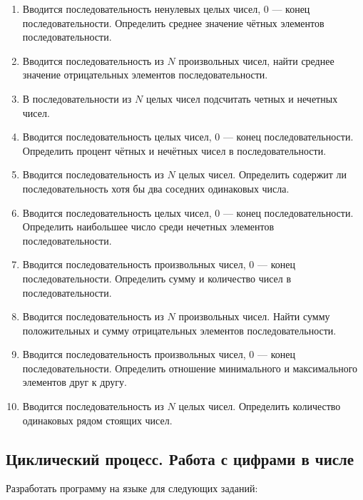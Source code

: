 \begin{enumerate}
\item Вводится последовательность ненулевых целых чисел, 0 --- конец последовательности. Определить среднее значение
чётных элементов последовательности.
\item Вводится последовательность из $N$ произвольных чисел, найти среднее значение отрицательных
элементов последовательности.
\item В последовательности из $N$ целых чисел подсчитать четных и нечетных чисел.
\item Вводится последовательность целых чисел, 0 --- конец последовательности. Определить процент чётных и нечётных чисел
в последовательности.
\item Вводится последовательность из $N$ целых чисел. Определить содержит ли последовательность хотя
бы два соседних одинаковых числа.
\item Вводится последовательность целых чисел, 0 --- конец последовательности. Определить наибольшее число среди нечетных
элементов последовательности.
\item Вводится последовательность произвольных чисел, 0 --- конец последовательности. Определить сумму и количество чисел
в последовательности.
\item Вводится последовательность из $N$ произвольных чисел. Найти сумму положительных и сумму
отрицательных элементов последовательности.
\item Вводится последовательность произвольных чисел, 0 --- конец последовательности. Определить отношение минимального и
максимального элементов друг к другу.
\item Вводится последовательность из $N$ целых чисел. Определить количество одинаковых рядом стоящих
чисел.
\end{enumerate}

\subsection[Циклический процесс. Работа с цифрами в числе]{Циклический процесс. Работа с цифрами в числе}
Разработать программу на языке  для следующих заданий:

